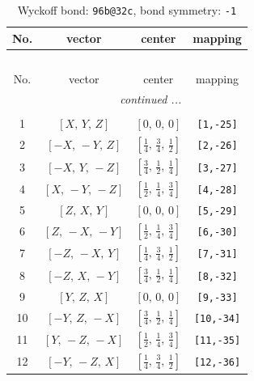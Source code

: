 \documentclass[fleqn,8pt]{jsarticle}
\begin{document}
\begin{longtable}{cccc}
\caption{Wyckoff bond: {\tt 96b@32c}, bond symmetry: {\tt -1}}
 \\
 \hline \hline
No. & vector & center & mapping \\ \hline \endfirsthead

\multicolumn{3}{l}{\tablename\ \thetable{}} \\
 \hline \hline
No. & vector & center & mapping \\ \hline \endhead

 \hline \hline
\multicolumn{3}{r}{\footnotesize\it continued ...} \\ \endfoot

 \hline \hline
\multicolumn{3}{r}{} \\ \endlastfoot

1 & $\left[ X,\, Y,\, Z \right]$ & $\left[ 0,\, 0,\, 0 \right]$ & {\tt [1,-25]} \\ \hline
2 & $\left[ - X,\, - Y,\, Z \right]$ & $\left[ \frac{1}{4},\, \frac{3}{4},\, \frac{1}{2} \right]$ & {\tt [2,-26]} \\ \hline
3 & $\left[ - X,\, Y,\, - Z \right]$ & $\left[ \frac{3}{4},\, \frac{1}{2},\, \frac{1}{4} \right]$ & {\tt [3,-27]} \\ \hline
4 & $\left[ X,\, - Y,\, - Z \right]$ & $\left[ \frac{1}{2},\, \frac{1}{4},\, \frac{3}{4} \right]$ & {\tt [4,-28]} \\ \hline
5 & $\left[ Z,\, X,\, Y \right]$ & $\left[ 0,\, 0,\, 0 \right]$ & {\tt [5,-29]} \\ \hline
6 & $\left[ Z,\, - X,\, - Y \right]$ & $\left[ \frac{1}{2},\, \frac{1}{4},\, \frac{3}{4} \right]$ & {\tt [6,-30]} \\ \hline
7 & $\left[ - Z,\, - X,\, Y \right]$ & $\left[ \frac{1}{4},\, \frac{3}{4},\, \frac{1}{2} \right]$ & {\tt [7,-31]} \\ \hline
8 & $\left[ - Z,\, X,\, - Y \right]$ & $\left[ \frac{3}{4},\, \frac{1}{2},\, \frac{1}{4} \right]$ & {\tt [8,-32]} \\ \hline
9 & $\left[ Y,\, Z,\, X \right]$ & $\left[ 0,\, 0,\, 0 \right]$ & {\tt [9,-33]} \\ \hline
10 & $\left[ - Y,\, Z,\, - X \right]$ & $\left[ \frac{3}{4},\, \frac{1}{2},\, \frac{1}{4} \right]$ & {\tt [10,-34]} \\ \hline
11 & $\left[ Y,\, - Z,\, - X \right]$ & $\left[ \frac{1}{2},\, \frac{1}{4},\, \frac{3}{4} \right]$ & {\tt [11,-35]} \\ \hline
12 & $\left[ - Y,\, - Z,\, X \right]$ & $\left[ \frac{1}{4},\, \frac{3}{4},\, \frac{1}{2} \right]$ & {\tt [12,-36]} \\ \hline

\end{longtable}
\end{document}
